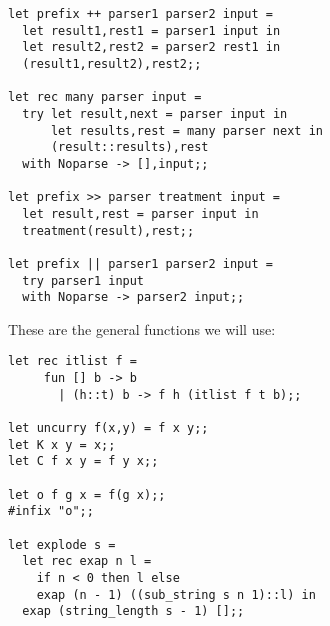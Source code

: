 \begin{slide*}


\vspace*{0.5cm}

\begin{black}\begin{verbatim}
let prefix ++ parser1 parser2 input =
  let result1,rest1 = parser1 input in
  let result2,rest2 = parser2 rest1 in
  (result1,result2),rest2;;

let rec many parser input =
  try let result,next = parser input in
      let results,rest = many parser next in
      (result::results),rest
  with Noparse -> [],input;;

let prefix >> parser treatment input =
  let result,rest = parser input in
  treatment(result),rest;;

let prefix || parser1 parser2 input =
  try parser1 input
  with Noparse -> parser2 input;;
\end{verbatim}\end{black}

\end{slide*}


\begin{slide*}


\vspace*{0.2cm}

These are the general functions we will use:
\begin{black}\begin{verbatim}
let rec itlist f =
     fun [] b -> b
       | (h::t) b -> f h (itlist f t b);;

let uncurry f(x,y) = f x y;;
let K x y = x;;
let C f x y = f y x;;

let o f g x = f(g x);;
#infix "o";;

let explode s =
  let rec exap n l =
    if n < 0 then l else
    exap (n - 1) ((sub_string s n 1)::l) in
  exap (string_length s - 1) [];;
\end{verbatim}\end{black}

\end{slide*}



